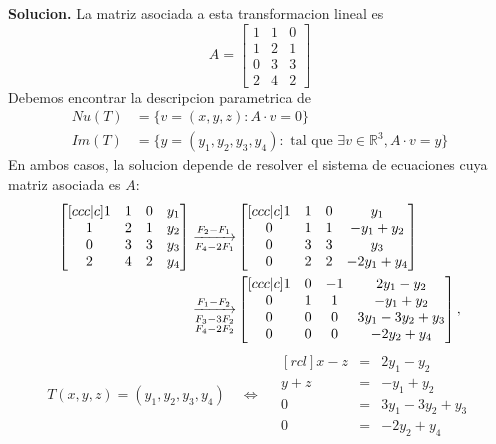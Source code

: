 \documentclass{article}
\theoremstyle{definition}
\theoremstyle{definition}
\theoremstyle{remark}
\begin{document}
\textbf{Solucion.} La matriz asociada a esta transformacion lineal es \[
  A=\begin{bmatrix}1 & 1 & 0 \\ 1 & 2 & 1 \\ 0 & 3 & 3 \\ 2 & 4 & 2 \end{bmatrix}
\]
Debemos encontrar la descripcion parametrica de \[
  \begin{aligned}
    Nu(T)&=\{v=(x,y,z) : A\cdot v = 0\} \\
    Im(T)&=\{y=(y_1,y_2,y_3,y_4) : \text{ tal que } \exists v \in \mathbb{R}^3 , A \cdot v = y\}
  \end{aligned}
\]
En ambos casos, la solucion depende de resolver el sistema de ecuaciones cuya matriz asociada es $A$:\[
  \begin{aligned}
    \begin{bmatrix}[ccc|c]
      1 & 1 & 0 &y_1 \\
      1 & 2 & 1 & y_2 \\
      0 & 3 & 3 & y_3 \\
      2 & 4 & 2 & y_4 
  \end{bmatrix}
  \underset{F_4-2F_1}{\xrightarrow{F_2-F_1}}
  &\begin{bmatrix}[ccc|c]
    1 & 1 & 0 & y_1 \\
    0 & 1 & 1 & -y_1+y_2 \\
    0 & 3 & 3 & y_3 \\ 
    0 & 2 & 2 & -2y_1 + y_4 
  \end{bmatrix} \\
  \underset{\begin{subarray}{l} F_3-3F_2 \\ F_4 - 2F_2 \end{subarray}}{\xrightarrow{F_1-F_2}}
  &\begin{bmatrix}[ccc|c]
    1 & 0 & -1 & 2y_1-y_2 \\
    0 & 1 & 1 & -y_1 + y_2 \\
    0 & 0 & 0 &  3y_1-3y_2 + y_3 \\
    0 & 0 & 0 & -2y_2+y_4
  \end{bmatrix},
  \end{aligned}
  \]\[
  T(x,y,z)=(y_1,y_2,y_3,y_4) \quad \Leftrightarrow \quad \begin{matrix}[rcl]
    x-z & = & 2y_1 - y_2 \\
    y+z & = & -y_1 + y_2 \\
    0 & = & 3y_1 -3y_2 + y_3 \\
    0 & = & -2y_2 + y_4 
  \end{matrix}
\]
\end{document}

